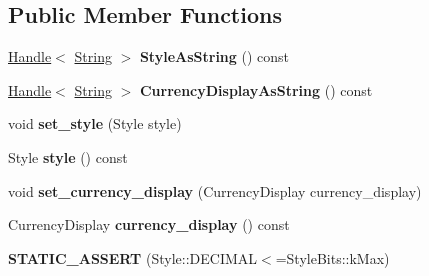 \subsection*{Public Member Functions}
\begin{DoxyCompactItemize}
\item 
\mbox{\label{classv8_1_1internal_1_1JSNumberFormat_ac7d0db7b8ff7dc59c6d9de9a25e55ba5}} 
\mbox{\hyperlink{classv8_1_1internal_1_1Handle}{Handle}}$<$ \mbox{\hyperlink{classv8_1_1internal_1_1String}{String}} $>$ {\bfseries Style\+As\+String} () const
\item 
\mbox{\label{classv8_1_1internal_1_1JSNumberFormat_a8b50b7790671dd9b8d1e33036671437b}} 
\mbox{\hyperlink{classv8_1_1internal_1_1Handle}{Handle}}$<$ \mbox{\hyperlink{classv8_1_1internal_1_1String}{String}} $>$ {\bfseries Currency\+Display\+As\+String} () const
\item 
\mbox{\label{classv8_1_1internal_1_1JSNumberFormat_a6a749b84d509bfdf0796b61e3c633b1b}} 
void {\bfseries set\+\_\+style} (Style style)
\item 
\mbox{\label{classv8_1_1internal_1_1JSNumberFormat_ae83e94ad68358b7d6237be62259b95ff}} 
Style {\bfseries style} () const
\item 
\mbox{\label{classv8_1_1internal_1_1JSNumberFormat_a52e1bedcdf438dce0bd04f3f0e842315}} 
void {\bfseries set\+\_\+currency\+\_\+display} (Currency\+Display currency\+\_\+display)
\item 
\mbox{\label{classv8_1_1internal_1_1JSNumberFormat_a562d404d8a8d5a037551bbd684eac8df}} 
Currency\+Display {\bfseries currency\+\_\+display} () const
\item 
\mbox{\label{classv8_1_1internal_1_1JSNumberFormat_af0de652e1472601e9acd891b33500097}} 
{\bfseries S\+T\+A\+T\+I\+C\+\_\+\+A\+S\+S\+E\+RT} (Style\+::\+D\+E\+C\+I\+M\+AL$<$=Style\+Bits\+::k\+Max)
\item 
\mbox{\label{classv8_1_1internal_1_1JSNumberFormat_afd61d4337ff40c698ad599198c4c70de}} 

\end{DoxyCompactItemize}
